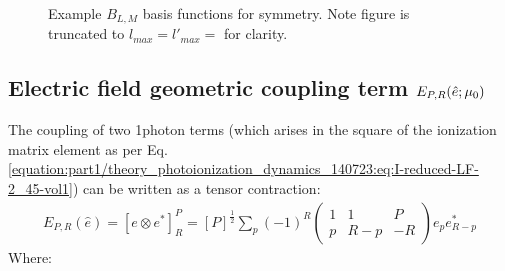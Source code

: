 \documentclass[letterpaper,table,10pt,english]{jupyterBook}
\begin{document}
\begin{figure}[htbp]
\centering
\capstart

\noindent{}
\caption{Example \(B_{L,M}\) basis functions for  symmetry. Note figure is truncated to \(l_{max}=l'_{max}=\) for clarity.}\label{\detokenize{part1/theory_tensor_formalism_160723:fig-blm-basis-d2h}}\end{figure}


\subsection{Electric field geometric coupling term \protect\({E_{P,R}(\hat{e};\mu_{0})}\protect\)}
\label{\detokenize{part1/theory_tensor_formalism_160723:electric-field-geometric-coupling-term-e-p-r-hat-e-mu-0}}\label{\detokenize{part1/theory_tensor_formalism_160723:sec-theory-epr-term}}
\sphinxAtStartPar
The coupling of two 1\sphinxhyphen{}photon terms (which arises in the square of the ionization matrix element as per Eq. \eqref{equation:part1/theory_photoionization_dynamics_140723:eq:I-reduced-LF-2_45-vol1}) can be written as a tensor contraction:
\begin{equation}\label{equation:part1/theory_tensor_formalism_160723:eq:EPR-defn-1}
\begin{split}
E_{P,R}(\hat{e})=[e\otimes e^{*}]_{R}^{P}=[P]^{\frac{1}{2}}\sum_{p}(-1)^{R}\left(\begin{array}{ccc}
1 & 1 & P\\
p & R-p & -R
\end{array}\right)e_{p}e_{R-p}^{*}
\end{split}
\end{equation}
\sphinxAtStartPar
Where:
\end{document}
